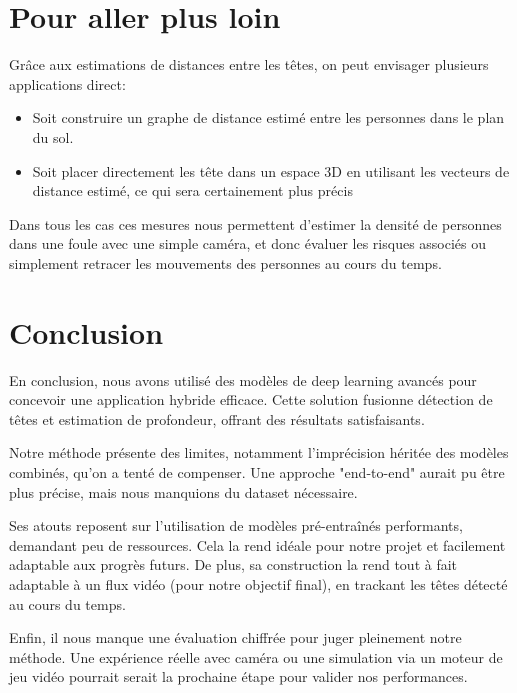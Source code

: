 \section{Pour aller plus loin}

Grâce aux estimations de distances entre les têtes, on peut envisager plusieurs applications direct:

\begin{itemize}
    \item Soit construire un graphe de distance estimé entre les personnes dans le plan du sol.
    \item Soit placer directement les tête dans un espace 3D en utilisant les vecteurs de distance estimé, ce qui sera certainement plus précis 
\end{itemize}

Dans tous les cas ces mesures nous permettent d'estimer la densité de personnes dans une foule avec une simple caméra, et donc évaluer les risques associés ou simplement retracer les mouvements des personnes au cours du temps.

\section{Conclusion}

En conclusion, nous avons utilisé des modèles de deep learning avancés pour concevoir une application hybride efficace. Cette solution fusionne détection de têtes et estimation de profondeur, offrant des résultats satisfaisants.

Notre méthode présente des limites, notamment l’imprécision héritée des modèles combinés, qu’on a tenté de compenser. Une approche "end-to-end" aurait pu être plus précise, mais nous manquions du dataset nécessaire.

Ses atouts reposent sur l’utilisation de modèles pré-entraînés performants, demandant peu de ressources. Cela la rend idéale pour notre projet et facilement adaptable aux progrès futurs. De plus, sa construction la rend tout à fait adaptable à un flux vidéo (pour notre objectif final), en trackant les têtes détecté au cours du temps.

Enfin, il nous manque une évaluation chiffrée pour juger pleinement notre méthode. Une expérience réelle avec caméra ou une simulation via un moteur de jeu vidéo pourrait serait la prochaine étape pour valider nos performances.
